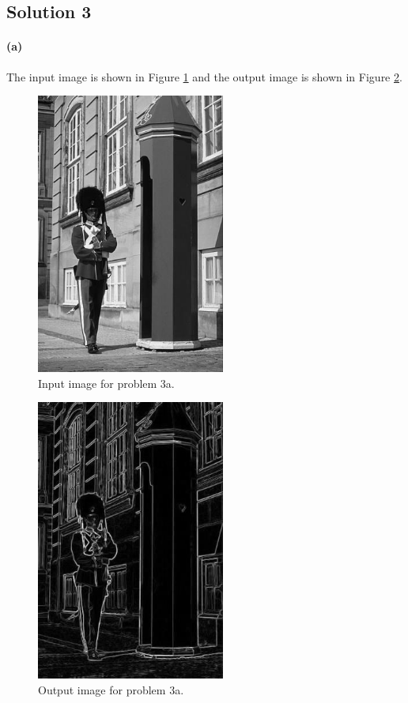 \documentclass{article}
\newcommand{\solution}[1]{\clearpage \subsection*{Solution #1}}
\newcommand{\spart}[1]{\paragraph{(#1)}}
\begin{document}
\solution{3}
\spart{a} The input image is shown in Figure \ref{fig:input3a} and the output image is shown in Figure \ref{fig:output3a}.
\begin{figure}[!h]
  \centering
    \includegraphics[height=25em]{code/inputs/p3_inp.jpg}
  \caption{Input image for problem 3a.}
  \label{fig:input3a}
\end{figure}

\begin{figure}[!h]
  \centering
    \includegraphics[height=25em]{code/outputs/prob3_a.jpg}
  \caption{Output image for problem 3a.}
  \label{fig:output3a}
\end{figure}
\end{document}
